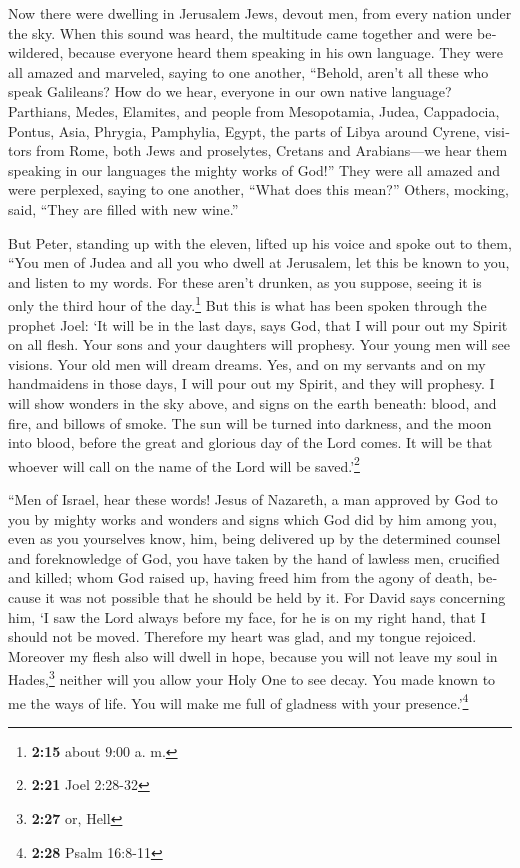 \begin{paracol}{2}
\begin{otherlanguage}{english}
 Now there were dwelling in Jerusalem Jews, devout men,
from every nation under the sky.  When this sound was
heard, the multitude came together and were bewildered, because everyone
heard them speaking in his own language.  They were all
amazed and marveled, saying to one another, ``Behold, aren't all these
who speak Galileans?  How do we hear, everyone in our own
native language?  Parthians, Medes, Elamites, and people
from Mesopotamia, Judea, Cappadocia, Pontus, Asia, 
Phrygia, Pamphylia, Egypt, the parts of Libya around Cyrene, visitors
from Rome, both Jews and proselytes,  Cretans and
Arabians---we hear them speaking in our languages the mighty works of
God!''  They were all amazed and were perplexed, saying
to one another, ``What does this mean?''  Others,
mocking, said, ``They are filled with new wine.''

 But Peter, standing up with the eleven, lifted up his
voice and spoke out to them, ``You men of Judea and all you who dwell at
Jerusalem, let this be known to you, and listen to my words.
 For these aren't drunken, as you suppose, seeing it is
only the third hour of the day.\footnote{\textbf{2:15} about 9:00 a. m.}
 But this is what has been spoken through the prophet
Joel:  `It will be in the last days, says God, that I
will pour out my Spirit on all flesh. Your sons and your daughters will
prophesy. Your young men will see visions. Your old men will dream
dreams.  Yes, and on my servants and on my handmaidens in
those days, I will pour out my Spirit, and they will prophesy.
 I will show wonders in the sky above, and signs on the
earth beneath: blood, and fire, and billows of smoke. 
The sun will be turned into darkness, and the moon into blood, before
the great and glorious day of the Lord comes.  It will be
that whoever will call on the name of the Lord will be
saved.'\footnote{\textbf{2:21} Joel 2:28-32}

 ``Men of Israel, hear these words! Jesus of Nazareth, a
man approved by God to you by mighty works and wonders and signs which
God did by him among you, even as you yourselves know, 
him, being delivered up by the determined counsel and foreknowledge of
God, you have taken by the hand of lawless men, crucified and killed;
 whom God raised up, having freed him from the agony of
death, because it was not possible that he should be held by it.
 For David says concerning him, `I saw the Lord always
before my face, for he is on my right hand, that I should not be moved.
 Therefore my heart was glad, and my tongue rejoiced.
Moreover my flesh also will dwell in hope,  because you
will not leave my soul in Hades,\footnote{\textbf{2:27} or, Hell}
neither will you allow your Holy One to see decay.  You
made known to me the ways of life. You will make me full of gladness
with your presence.'\footnote{\textbf{2:28} Psalm 16:8-11}


\end{otherlanguage}
\end{paracol}
